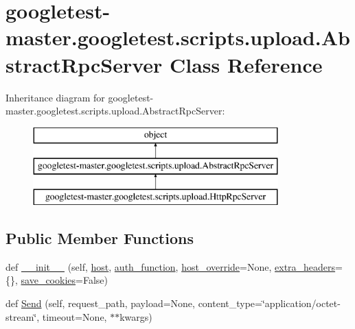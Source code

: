 \hypertarget{classgoogletest-master_1_1googletest_1_1scripts_1_1upload_1_1_abstract_rpc_server}{}\section{googletest-\/master.googletest.\+scripts.\+upload.\+Abstract\+Rpc\+Server Class Reference}
\label{classgoogletest-master_1_1googletest_1_1scripts_1_1upload_1_1_abstract_rpc_server}
Inheritance diagram for googletest-\/master.googletest.\+scripts.\+upload.\+Abstract\+Rpc\+Server\+:\begin{figure}[H]
\begin{center}
\leavevmode
\includegraphics[height=3.000000cm]{d8/dcc/classgoogletest-master_1_1googletest_1_1scripts_1_1upload_1_1_abstract_rpc_server}
\end{center}
\end{figure}
\subsection*{Public Member Functions}
\begin{DoxyCompactItemize}
\item 
def \mbox{\hyperlink{classgoogletest-master_1_1googletest_1_1scripts_1_1upload_1_1_abstract_rpc_server_ab7c84aa7f8f377b98188c9120cfcc355}{\+\_\+\+\_\+init\+\_\+\+\_\+}} (self, \mbox{\hyperlink{classgoogletest-master_1_1googletest_1_1scripts_1_1upload_1_1_abstract_rpc_server_a2090c8d1f81038133a15955cf69c95dc}{host}}, \mbox{\hyperlink{classgoogletest-master_1_1googletest_1_1scripts_1_1upload_1_1_abstract_rpc_server_a3a4b375efe3c7505f24412461baa954e}{auth\+\_\+function}}, \mbox{\hyperlink{classgoogletest-master_1_1googletest_1_1scripts_1_1upload_1_1_abstract_rpc_server_a4f804817fba9817ec5052bf1c7bfbf2a}{host\+\_\+override}}=None, \mbox{\hyperlink{classgoogletest-master_1_1googletest_1_1scripts_1_1upload_1_1_abstract_rpc_server_ad8f845b60b361647b7321bbae7e075fc}{extra\+\_\+headers}}=\{\}, \mbox{\hyperlink{classgoogletest-master_1_1googletest_1_1scripts_1_1upload_1_1_abstract_rpc_server_af2b3b3b8fbe9ea78c1409cbdc60ed328}{save\+\_\+cookies}}=False)
\item 
def \mbox{\hyperlink{classgoogletest-master_1_1googletest_1_1scripts_1_1upload_1_1_abstract_rpc_server_a7e930824ec16c036602fa4abb7ee6f02}{Send}} (self, request\+\_\+path, payload=None, content\+\_\+type=\char`\"{}application/octet-\/stream\char`\"{}, timeout=None, $\ast$$\ast$kwargs)
\end{DoxyCompactItemize}
